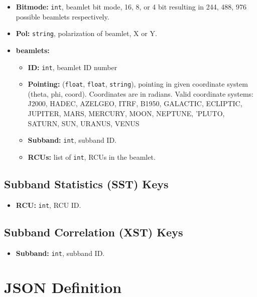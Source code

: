 \documentclass[10pt,a4paper]{article}
\begin{document}
\begin{itemize}
    \item \textbf{Bitmode:} \texttt{int}, beamlet bit mode, 16, 8, or 4 bit
    resulting in 244, 488, 976 possible beamlets respectively.
    \item \textbf{Pol:} \texttt{string}, polarization of beamlet, X or Y.
    \item \textbf{beamlets:}
    \begin{itemize}
        \item \textbf{ID:} \texttt{int}, beamlet ID number
        \item \textbf{Pointing:} (\texttt{float}, \texttt{float},
        \texttt{string}), pointing in given coordinate system (theta, phi,
        coord). Coordinates are in radians. Valid coordinate systems: J2000,
        HADEC, AZELGEO, ITRF, B1950, GALACTIC, ECLIPTIC, JUPITER, MARS, MERCURY,
        MOON, NEPTUNE, 'PLUTO, SATURN, SUN, URANUS, VENUS
        \item \textbf{Subband:} \texttt{int}, subband ID.
        \item \textbf{RCUs:} list of \texttt{int}, RCUs in the beamlet.
    \end{itemize}

\end{itemize}

\subsection{Subband Statistics (SST) Keys}
\label{sec:sst_keys}

\begin{itemize}
    \item \textbf{RCU:} \texttt{int}, RCU ID.
\end{itemize}

\subsection{Subband Correlation (XST) Keys}
\label{sec:xst_keys}

\begin{itemize}
    \item \textbf{Subband:} \texttt{int}, subband ID.
\end{itemize}

\section{JSON Definition}
\end{document}

